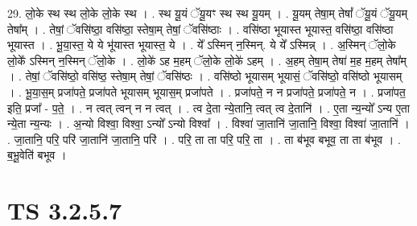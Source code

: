 \documentclass[17pt]{extarticle}
\begin{document}
29. लो॒के स्थ स्थ लो॒के लो॒के स्थ । . स्थ यू॒यं ॅयू॒यꣳ स्थ स्थ यू॒यम् । . यू॒यम् तेषा॒म् तेषां᳚ ॅयू॒यं ॅयू॒यम् तेषा᳚म् । . तेषां॒ ॅवसि॑ष्ठा॒ वसि॑ष्ठा॒ स्तेषा॒म् तेषां॒ ॅवसि॑ष्ठाः । . वसि॑ष्ठा भूयास्त भूयास्त॒ वसि॑ष्ठा॒ वसि॑ष्ठा भूयास्त । . भू॒या॒स्त॒ ये ये भू॑यास्त भूयास्त॒ ये । . ये᳚ ऽस्मिन् न॒स्मिन्. ये ये᳚ ऽस्मिन्न् । . अ॒स्मिन् ॅलो॒के लो॒के᳚ ऽस्मिन् न॒स्मिन् ॅलो॒के । . लो॒के॑ ऽह म॒हम् ॅलो॒के लो॒के॑ ऽहम् । . अ॒हम् तेषा॒म् तेषा॑ म॒ह म॒हम् तेषा᳚म् । . तेषां॒ ॅवसि॑ष्ठो॒ वसि॑ष्ठ॒ स्तेषा॒म् तेषां॒ ॅवसि॑ष्ठः । . वसि॑ष्ठो भूयासम् भूयासं॒ ॅवसि॑ष्ठो॒ वसि॑ष्ठो भूयासम् । . भू॒या॒स॒म् प्रजा॑पते॒ प्रजा॑पते भूयासम् भूयास॒म् प्रजा॑पते । . प्रजा॑पते॒ न न प्रजा॑पते॒ प्रजा॑पते॒ न । . प्रजा॑पत॒ इति॒ प्रजा᳚ - प॒ते॒ । . न त्वत् त्वन् न न त्वत् । . त्व दे॒ता न्ये॒तानि॒ त्वत् त्व दे॒तानि॑ । . ए॒ता न्य॒न्यो᳚ ऽन्य ए॒ता न्ये॒ता न्य॒न्यः । . अ॒न्यो विश्वा॒ विश्वा॒ ऽन्यो᳚ ऽन्यो विश्वा᳚ । . विश्वा॑ जा॒तानि॑ जा॒तानि॒ विश्वा॒ विश्वा॑ जा॒तानि॑ । . जा॒तानि॒ परि॒ परि॑ जा॒तानि॑ जा॒तानि॒ परि॑ । . परि॒ ता ता परि॒ परि॒ ता । . ता ब॑भूव बभूव॒ ता ता ब॑भूव । . ब॒भू॒वेति॑ बभूव । \newline


\section{ TS 3.2.5.7 }
\end{document}
